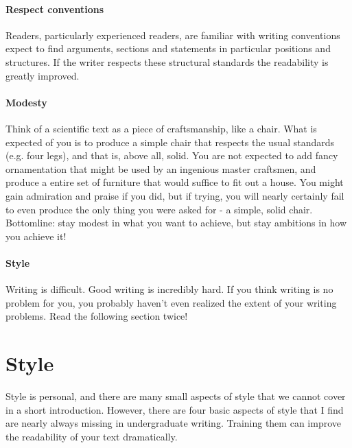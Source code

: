 \documentclass{tufte-book}
\begin{document}
\paragraph{Respect conventions} Readers, particularly experienced readers, are familiar with writing conventions expect to find arguments, sections and statements in particular positions and structures. If the writer respects these structural standards the readability is greatly improved. 


\paragraph{Modesty} Think of a scientific text as a piece of craftsmanship, like a chair. What is expected of you is to produce a simple chair that respects the usual standards (e.g. four legs), and that is, above all, solid. You are not expected to add fancy ornamentation that might be used by an ingenious master craftsmen, and produce a entire set of furniture that would suffice to fit out a house. You might gain admiration and praise if you did, but if trying, you will nearly certainly fail to even produce the only thing you were asked for - a simple, solid chair. Bottomline: stay modest in what you want to achieve, but stay ambitions in how you achieve it!


\paragraph{Style} Writing is difficult. Good writing is incredibly hard. If you think writing is no problem for you, you probably haven't even realized the extent of your writing problems. Read the following section twice!


\section{Style}

Style is personal, and there are many small aspects of style that we cannot cover in a short introduction. However, there are four basic aspects of style that I find are nearly always missing in undergraduate writing. Training them can improve the readability of your text dramatically. 
\end{document}

